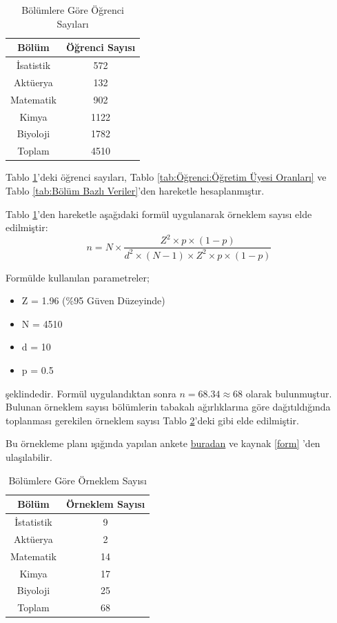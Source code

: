 \documentclass{article}
\begin{document}
\clearpage

\begin{table}[h]
    \centering
    \caption{Bölümlere Göre Öğrenci Sayıları}
    \label{tab:Bölüm bazlı öğrenci sayıları}
    \begin{tabular}{|c|c|}
        \hline
        Bölüm & Öğrenci Sayısı\\
        \hline
        İsatistik & 572 \\
        Aktüerya & 132 \\
        Matematik & 902 \\
        Kimya & 1122 \\
        Biyoloji & 1782 \\
        \hline
        Toplam & 4510 \\
        \hline
    \end{tabular}
\end{table}

Tablo \ref{tab:Bölüm bazlı öğrenci sayıları}'deki öğrenci sayıları, Tablo \ref{tab:Öğrenci:Öğretim Üyesi Oranları} ve Tablo \ref{tab:Bölüm Bazlı Veriler}'den hareketle hesaplanmıştır. 

\vspace{10pt}
Tablo \ref{tab:Bölüm bazlı öğrenci sayıları}'den hareketle aşağıdaki formül uygulanarak örneklem sayısı elde edilmiştir:
$$
n = N \times \frac{Z^2 \times p \times (1-p)}{d^2 \times (N-1) \times Z^2 \times p \times (1-p)}
$$

Formülde kullanılan parametreler;
\begin{itemize}
    \item Z = 1.96 (\%95 Güven Düzeyinde)
    \item N = 4510
    \item d = 10
    \item p = 0.5
\end{itemize} şeklindedir. Formül uygulandıktan sonra $n=68.34 \approx 68$ olarak bulunmuştur. Bulunan örneklem sayısı bölümlerin tabakalı ağırlıklarına göre dağıtıldığında toplanması gerekilen örneklem sayısı Tablo \ref{tab:ağırlıklandırılmış örneklem}'deki gibi elde edilmiştir.

Bu örnekleme planı ışığında yapılan ankete \href{https://docs.google.com/forms/d/e/1FAIpQLSf7CBA1tg89lFSdAl9VRSa4vjmv8COCJtRDvQmYa0n0l72JUA/viewform?usp=sf_link}{buradan} ve kaynak \ref{form} 'den ulaşılabilir. 

\begin{table}[h]
    \centering
    \caption{Bölümlere Göre Örneklem Sayısı}
    \label{tab:ağırlıklandırılmış örneklem}
    \begin{tabular}{|c|c|}
         \hline
         Bölüm & Örneklem Sayısı \\
         \hline
         İstatistik & 9 \\
         Aktüerya & 2 \\
         Matematik & 14 \\
         Kimya & 17 \\
         Biyoloji & 25 \\
         \hline
         Toplam & 68 \\
         \hline
    \end{tabular}
\end{table}
\end{document}
